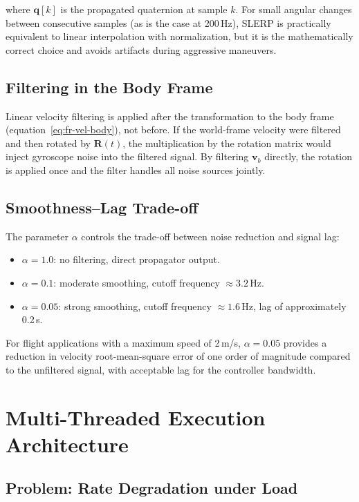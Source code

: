 where $\mathbf{q}[k]$ is the propagated quaternion at sample $k$. For small
angular changes between consecutive samples (as is the case at 200\,Hz), SLERP is
practically equivalent to linear interpolation with normalization, but it is the
mathematically correct choice and avoids artifacts during aggressive maneuvers.

\subsection{Filtering in the Body Frame}
\label{sec:fr-body-filtering}

Linear velocity filtering is applied after the transformation to the body frame
(equation~\eqref{eq:fr-vel-body}), not before. If the world-frame velocity were
filtered and then rotated by $\mathbf{R}(t)$, the multiplication by the rotation
matrix would inject gyroscope noise into the filtered signal. By filtering
$\mathbf{v}_b$ directly, the rotation is applied once and the filter handles all
noise sources jointly.

\subsection{Smoothness--Lag Trade-off}
\label{sec:fr-tradeoff}

The parameter $\alpha$ controls the trade-off between noise reduction and signal
lag:

\begin{itemize}
    \item $\alpha = 1.0$: no filtering, direct propagator output.
    \item $\alpha = 0.1$: moderate smoothing, cutoff frequency $\approx 3.2$\,Hz.
    \item $\alpha = 0.05$: strong smoothing, cutoff frequency $\approx 1.6$\,Hz,
    lag of approximately 0.2\,s.
\end{itemize}

For flight applications with a maximum speed of 2\,m/s, $\alpha = 0.05$ provides a
reduction in velocity root-mean-square error of one order of magnitude compared to
the unfiltered signal, with acceptable lag for the controller bandwidth.

\section{Multi-Threaded Execution Architecture}
\label{sec:fr-multithreading}

\subsection{Problem: Rate Degradation under Load}
\label{sec:fr-degradation}

